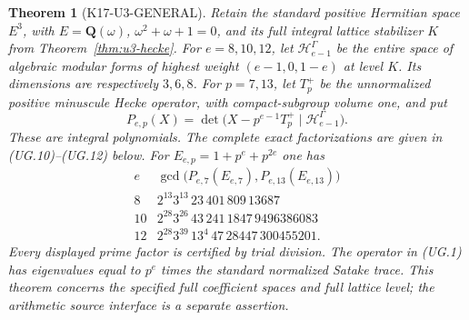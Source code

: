 \documentclass[11pt,a4paper]{article}
\newtheorem{theorem}{Theorem}[section]
\theoremstyle{definition}
\begin{document}
\begin{theorem}[K17-U3-GENERAL]\label{thm:u3-general}
Retain the standard positive Hermitian space $E^3$, with
$E=\mathbf Q(\omega)$, $\omega^2+\omega+1=0$, and its full integral
lattice stabilizer $K$ from Theorem~\ref{thm:u3-hecke}.
For $e=8,10,12$, let $\mathcal H_{e-1}^{\Gamma}$ be the entire space
of algebraic modular forms of highest weight $(e-1,0,1-e)$ at level $K$.
Its dimensions are respectively $3,6,8$.
For $p=7,13$, let $T_p^+$ be the unnormalized positive minuscule
Hecke operator, with compact-subgroup volume one, and put
\[
 P_{e,p}(X)=\det\bigl(X-p^{e-1}T_p^+\mid
                       \mathcal H_{e-1}^{\Gamma}\bigr).
 \tag{UG.1}
\]
These are integral polynomials. The complete exact factorizations are
given in (UG.10)--(UG.12) below. For $E_{e,p}=1+p^e+p^{2e}$ one has
\[
\begin{array}{c|l}
e&\gcd\bigl(P_{e,7}(E_{e,7}),P_{e,13}(E_{e,13})\bigr)\\ \hline
8&2^{13}3^{13}\,23\,401\,809\,13687\\
10&2^{28}3^{26}\,43\,241\,1847\,9496386083\\
12&2^{28}3^{39}\,13^4\,47\,28447\,300455201.
\end{array}
\tag{UG.2}
\]
Every displayed prime factor is certified by trial division. The
operator in (UG.1) has eigenvalues equal to $p^e$ times the standard
normalized Satake trace. This theorem concerns the specified full
coefficient spaces and full lattice level; the arithmetic source
interface is a separate assertion.
\end{theorem}
\end{document}
